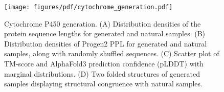 \begin{figure}[!htb]
    \centering
    \texttt{[image: figures/pdf/cytochrome\_generation.pdf]}
    \caption{Cytochrome P450 generation. (A) Distribution densities of the protein sequence lengths for generated and natural samples. (B) Distribution densities of Progen2 PPL for generated and natural samples, along with randomly shuffled sequences. (C) Scatter plot of TM-score and AlphaFold3 prediction confidence (pLDDT) with marginal distributions. (D) Two folded structures of generated samples displaying structural congruence with natural samples.}
    \label{fig:cytochrome_generation}
\end{figure}